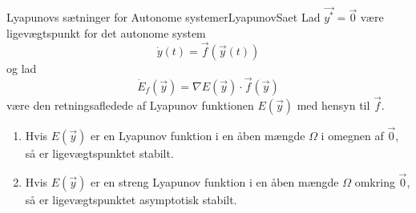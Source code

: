 \begin{mytheo}{Lyapunovs sætninger for Autonome systemer}{LyapunovSaet}
Lad $\vec{y^*} = \vec{0}$ være ligevægtspunkt for det autonome system
$$\dot{y}(t)=\vec{f}(\vec{y}(t))$$
og lad 
$$\dot{E}_f(\vec{y})=\nabla E(\vec{y}) \cdot \vec{f}(\vec{y})$$
være den retningsafledede af Lyapunov funktionen $E(\vec{y})$ med hensyn til $\vec{f}$.
\begin{enumerate}
  \item Hvis $E(\vec{y})$ er en Lyapunov funktion  i en åben mængde $\Omega$ i omegnen af $\vec{0}$, så er ligevægtspunktet stabilt.
  \item Hvis $E(\vec{y})$ er en streng Lyapunov funktion i en åben mængde $\Omega$ omkring $\vec{0}$, så er ligevægtspunktet asymptotisk stabilt.
\end{enumerate}
\end{mytheo}
